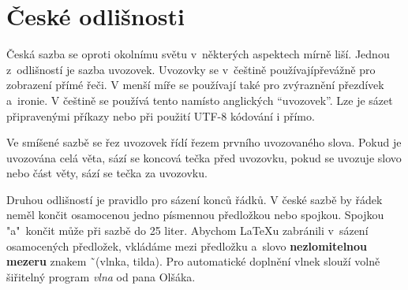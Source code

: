 \documentclass[11pt, a4paper, twocolumn]{article}
\begin{document}
\section{České odlišnosti}

    Česká sazba se oproti okolnímu světu v~některých aspektech mírně liší. Jednou z~odlišností je sazba uvozovek. Uvozovky se v~češtině používají­převážně pro zobrazení přímé řeči. V menší míře se používají také pro zvýraznění přezdívek a~ironie. V češtině se po\-u\-ží\-vá tento \textbf{} namísto anglických ``uvozovek''. Lze je sázet připravenými příkazy nebo při použití UTF-8 kódování i přímo.
\par
Ve smíšené sazbě se řez uvozovek řídí řezem prvního uvozovaného slova. Pokud je uvozována celá věta, sází se koncová tečka před uvozovku, pokud se uvozuje slovo nebo část věty, sází se tečka za uvozovku.
\par
    Druhou odlišností je pravidlo pro sázení konců řádků. V české sazbě by řádek neměl končit osamocenou jedno písmennou předložkou nebo spojkou. Spojkou "a"~končit může při sazbě do 25 liter. Abychom \LaTeX u zabránili v~sázení osamocených předložek, vkládáme mezi předložku a~slovo \textbf{nezlomitelnou mezeru} znakem \~\ (vlnka, tilda). Pro automatické doplnění vlnek slouží volně šiřitelný program \emph{vlna} od pana Olšáka\footnotemark[1].

\end{document}
